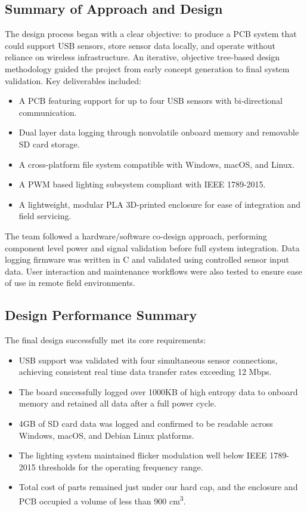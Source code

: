 \documentclass[12pt]{article}
\begin{document}
\subsection{Summary of Approach and Design}

\par The design process began with a clear objective: to produce a PCB system that could support USB sensors, store sensor data locally, and operate without reliance on wireless infrastructure. An iterative, objective tree-based design methodology guided the project from early concept generation to final system validation. Key deliverables included:

\begin{itemize}
\item A PCB featuring support for up to four USB sensors with bi-directional communication.
\item Dual layer data logging through nonvolatile onboard memory and removable SD card storage.
\item A cross-platform file system compatible with Windows, macOS, and Linux.
\item A PWM based lighting subsystem compliant with IEEE 1789-2015.
\item A lightweight, modular PLA 3D-printed enclosure for ease of integration and field servicing.
\end{itemize}

\par The team followed a hardware/software co-design approach, performing component level power and signal validation before full system integration. Data logging firmware was written in C and validated using controlled sensor input data. User interaction and maintenance workflows were also tested to ensure ease of use in remote field environments.

\subsection{Design Performance Summary}

The final design successfully met its core requirements:

\begin{itemize}
\item USB support was validated with four simultaneous sensor connections, achieving consistent real time data transfer rates exceeding 12 Mbps.
\item The board successfully logged over 1000KB of high entropy data to onboard memory and retained all data after a full power cycle.
\item 4GB of SD card data was logged and confirmed to be readable across Windows, macOS, and Debian Linux platforms.
\item The lighting system maintained flicker modulation well below IEEE 1789-2015 thresholds for the operating frequency range.
\item Total cost of parts remained just under our hard cap, and the enclosure and PCB occupied a volume of less than 900 cm\textsuperscript{3}.
\end{itemize}
\end{document}
